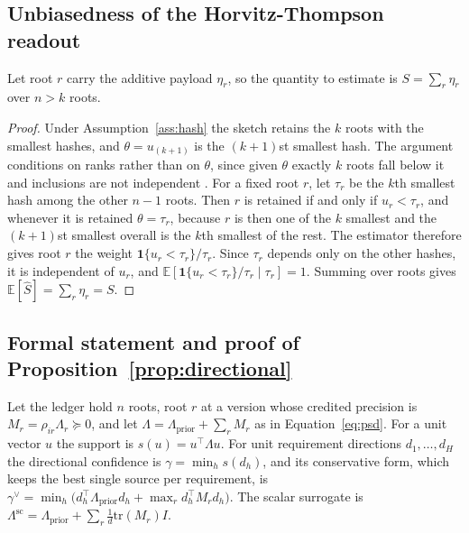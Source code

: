 \documentclass{article}
\begin{document}
\subsection{Unbiasedness of the Horvitz-Thompson readout}

Let root $r$ carry the additive payload $\eta_r$, so the quantity to estimate
is $S=\sum_r\eta_r$ over $n>k$ roots.

\begin{proof}
Under Assumption~\ref{ass:hash} the sketch retains the $k$ roots with the
smallest hashes, and $\theta=u_{(k+1)}$ is the $(k+1)$st smallest hash. The
argument conditions on ranks rather than on $\theta$, since given $\theta$
exactly $k$ roots fall below it and inclusions are not independent
\citep{cohen2007bottomk}. For a fixed root $r$, let $\tau_r$ be the $k$th
smallest hash among the other $n-1$ roots. Then $r$ is retained if and only if
$u_r<\tau_r$, and whenever it is retained $\theta=\tau_r$, because $r$ is then
one of the $k$ smallest and the $(k+1)$st smallest overall is the $k$th smallest
of the rest. The estimator therefore gives root $r$ the weight
$\mathbf{1}\{u_r<\tau_r\}/\tau_r$. Since $\tau_r$ depends only on the other
hashes, it is independent of $u_r$, and
$\mathbb{E}[\mathbf{1}\{u_r<\tau_r\}/\tau_r\mid\tau_r]=1$. Summing over roots
gives $\mathbb{E}[\hat S]=\sum_r\eta_r=S$.
\end{proof}

\subsection{Formal statement and proof of Proposition~\ref{prop:directional}}

Let the ledger hold $n$ roots, root $r$ at a version whose credited precision
is $M_r=\rho_{ir}\Lambda_r\succeq0$, and let
$\Lambda=\Lambda_{\text{prior}}+\sum_rM_r$ as in Equation~\ref{eq:psd}. For a
unit vector $u$ the support is $s(u)=u^\top\Lambda u$. For unit requirement
directions $d_1,\dots,d_H$ the directional confidence is
$\gamma=\min_hs(d_h)$, and its conservative form, which keeps the best single
source per requirement, is
$\gamma^\vee=\min_h\bigl(d_h^\top\Lambda_{\text{prior}}d_h+\max_rd_h^\top
M_rd_h\bigr)$. The scalar surrogate is
$\Lambda^{\mathrm{sc}}=\Lambda_{\text{prior}}+\sum_r\tfrac{1}{d}\mathrm{tr}(M_r)I$.
\end{document}
